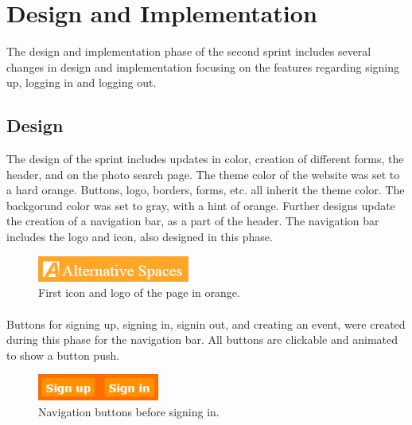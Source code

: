 \section{Design and Implementation} 
\label{sec:S2DesignImpl}
The design and implementation phase of the second sprint includes several changes in design and implementation focusing on the features regarding signing up, logging in and logging out. 

\subsection{Design}
\label{subsec:S2DesignImplDesign}
The design of the sprint includes updates in color, creation of different forms, the header, and on the photo search page. The theme color of the website was set to a hard orange. Buttons, logo, borders, forms, etc. all inherit the theme color. The backgorund color was set to gray, with a hint of orange. Further designs update the creation of a navigation bar, as a part of the header. The navigation bar includes the logo and icon, also designed in this phase. \\%
%
\begin{figure}[ht!]
\centering
\includegraphics[width=50mm]{Sprint2/img/Sprint2-logo1.png}
\caption{First icon and logo of the page in orange. \label{overflow}}
\end{figure}

\paragraph{} Buttons for signing up, signing in, signin out, and creating an event, were created during this phase for the navigation bar. All buttons are clickable and animated to show a button push. \\%
%
\begin{figure}[ht!]
\centering
\includegraphics[width=40mm]{Sprint2/img/Sprint2-buttons1.png}
\caption{Navigation buttons before signing in. \label{overflow}}
\end{figure}

